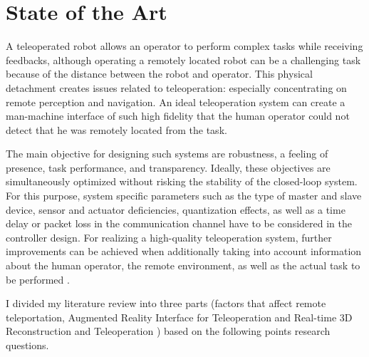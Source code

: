 \section{State of the Art}

A teleoperated robot allows an operator to perform complex tasks while receiving feedbacks, although operating a remotely located robot can be a challenging task because of the distance between the robot and operator.
This physical detachment creates issues related to teleoperation: especially concentrating on remote perception and navigation. An ideal teleoperation system can create a man-machine interface of such high fidelity that the human operator could not detect that he was remotely located from the task.

The main objective for designing such systems are robustness, a feeling of presence, task performance, and transparency. Ideally, these objectives are simultaneously optimized without risking the stability of the closed-loop system. For this purpose, system specific parameters such as the type of master and slave device, sensor and actuator deficiencies, quantization effects, as well as a time delay or packet loss in the communication channel have to be considered in the controller design. For realizing a high-quality teleoperation system, further improvements can be achieved when additionally taking into account information about the human operator, the remote environment, as well as the actual task to be performed \cite{passenberg2010survey}.

I divided my literature review into three parts (factors that affect remote teleportation, Augmented Reality Interface for Teleoperation and  Real-time 3D Reconstruction and Teleoperation ) based on the following points research questions.

